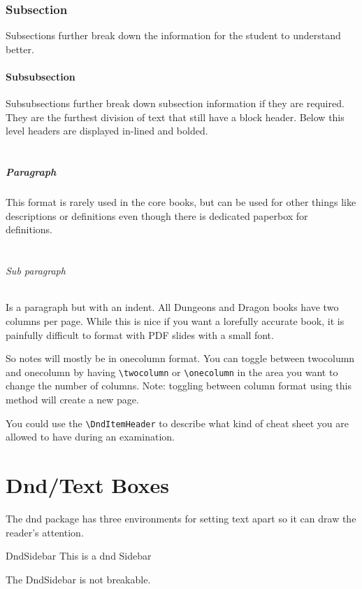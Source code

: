 \documentclass[letterpaper,10pt,twoside,onecolumn,openany,draft]{book}
\begin{document}
\subsection{Subsection}
Subsections further break down the information for the student to understand better. 

\subsubsection{Subsubsection}
Subsubsections further break down subsection information if they are required. They are the furthest division of text that still have a block header. Below this level headers are displayed in-lined and bolded.
\\~\\
\paragraph{Paragraph}
This format is rarely used in the core books, but can be used for other things like descriptions or definitions even though there is dedicated paperbox for definitions. 
\\~\\
\subparagraph{Sub paragraph}
Is a paragraph but with an indent.
\newpage
All Dungeons and Dragon books have two columns per page. While this is nice if you want a lorefully accurate book, it is painfully difficult to format with PDF slides with a small font. 

So notes will mostly be in onecolumn format. You can toggle between twocolumn and onecolumn by having \texttt{\textbackslash{twocolumn}} or \texttt{\textbackslash{onecolumn}} in the area you want to change the number of columns. Note: toggling between column format using this method will create a new page.

You could use the \texttt{\textbackslash{DndItemHeader}} to describe what kind of cheat sheet you are allowed to have during an examination.

\onecolumn

\chapter{Dnd/Text Boxes}
The dnd package has three environments for setting text apart so it can draw the reader's attention. 

\begin{DndSidebar}[color=PhbLightGreen]{DndSidebar}
  This is a dnd Sidebar
\end{DndSidebar}
The DndSidebar is not breakable.
\end{document}
